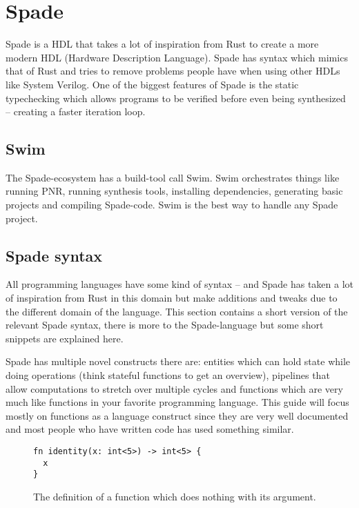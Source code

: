 \section{Spade}
Spade is a HDL that takes a lot of inspiration from Rust to create a more modern HDL (Hardware Description Language). Spade has syntax which mimics that of Rust and tries to remove problems people have when using other HDLs like System Verilog. One of the biggest features of Spade is the static typechecking which allows programs to be verified before even being synthesized -- creating a faster iteration loop.
\cite{src:spadeSomething} \cite{src:spadeAnHDL}

\subsection{Swim}
The Spade-ecosystem has a build-tool call Swim. Swim orchestrates things like running PNR, running synthesis tools, installing dependencies, generating basic projects and compiling Spade-code. Swim is the best way to handle any Spade project.

\subsection{Spade syntax}
All programming languages have some kind of syntax -- and Spade has taken a lot of inspiration from Rust in this domain but make additions and tweaks due to the different domain of the language. This section contains a short version of the relevant Spade syntax, there is more to the Spade-language but some short snippets are explained here.

Spade has multiple novel constructs there are: entities which can hold state while doing operations (think stateful functions to get an overview), pipelines that allow computations to stretch over multiple cycles and functions which are very much like functions in your favorite programming language. This guide will focus mostly on functions as a language construct since they are very well documented and most people who have written code has used something similar.

\begin{figure}
\begin{verbatim}
fn identity(x: int<5>) -> int<5> {
  x
}
\end{verbatim}
  \caption{The definition of a function which does nothing with its argument.}
  \label{fig:SpadeExample1}
\end{figure}

